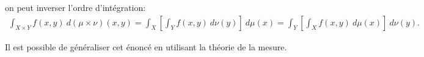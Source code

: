 on peut inverser l'ordre d'intégration:
\begin{align}
  \label{eq:thfubini2}
  \int_{X\times Y}f(x,y)~ d(\mu\times\nu)(x,y)=\int_X\left[\int_Y
    f(x,y)~ d\nu(y)\right]~ d\mu(x)=\int_Y\left[\int_X f(x,y)~
    d\mu(x)\right]~ d\nu(y).
\end{align}

Il est possible de généraliser cet énoncé en utilisant la théorie de
la mesure.

